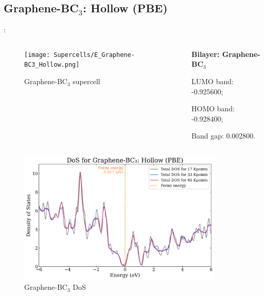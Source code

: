 \documentclass[xcolor=dvipsnames]{beamer}
\begin{document}
\subsection{Graphene-BC\texorpdfstring{$_\text{3}$}{3}: Hollow (PBE)}
\begin{frame}{\insertsection: \insertsubsection}
\begin{columns}
    \begin{column}{0.5\textwidth}\begin{figure}
        \texttt{[image: Supercells/E\_Graphene-BC3\_Hollow.png]}
        \caption{Graphene-BC$_\text{3}$ supercell}
    \end{figure}\end{column}
    \begin{column}{0.5\textwidth}
        \par \textbf{Bilayer: Graphene-BC$_\text{3}$}
        \par\quad LUMO band: -0.925600;
        \par\quad HOMO band: -0.928400;
        \par\quad Band gap: 0.002800.
    \end{column}
\end{columns}
\begin{columns}
    \begin{column}{0.45\textwidth}\begin{figure}
        \includegraphics[width=1\textwidth]{PDoS/G-BC3_dos.png}
        \caption{Graphene-BC$_\text{3}$ DoS}
    \end{figure}\end{column}
    \begin{column}{0.55\textwidth}\begin{figure}

\end{figure}
\end{column}
\end{columns}
\end{frame}
\end{document}
